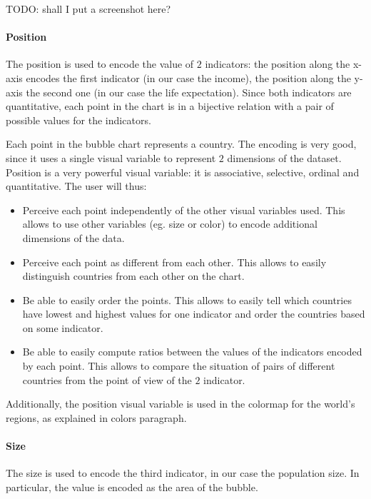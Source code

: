 \vspace{0.5cm}
TODO: shall I put a screenshot here?


\paragraph{Position}
The position is used to encode the value of $2$ indicators: the position along the x-axis encodes the first indicator (in our case the income), the position along the y-axis the second one (in our case the life expectation).
Since both indicators are quantitative, each point in the chart is in a bijective relation with a pair of possible values for the indicators.

Each point in the bubble chart represents a country.
The encoding is very good, since it uses a single visual variable to represent $2$ dimensions of the dataset.
Position is a very powerful visual variable: it is associative, selective, ordinal and quantitative.
The user will thus:
\begin{itemize}
    \item Perceive each point independently of the other visual variables used. This allows to use other variables (eg. size or color) to encode additional dimensions of the data.
    \item Perceive each point as different from each other. This allows to easily distinguish countries from each other on the chart.
    \item Be able to easily order the points. This allows to easily tell which countries have lowest and highest values for one indicator and order the countries based on some indicator.
    \item Be able to easily compute ratios between the values of the indicators encoded by each point. This allows to compare the situation of pairs of different countries from the point of view of the $2$ indicator.
\end{itemize}

Additionally, the position visual variable is used in the colormap for the world's regions, as explained in colors paragraph.


\paragraph{Size}
The size is used to encode the third indicator, in our case the population size.
In particular, the value is encoded as the area of the bubble.

